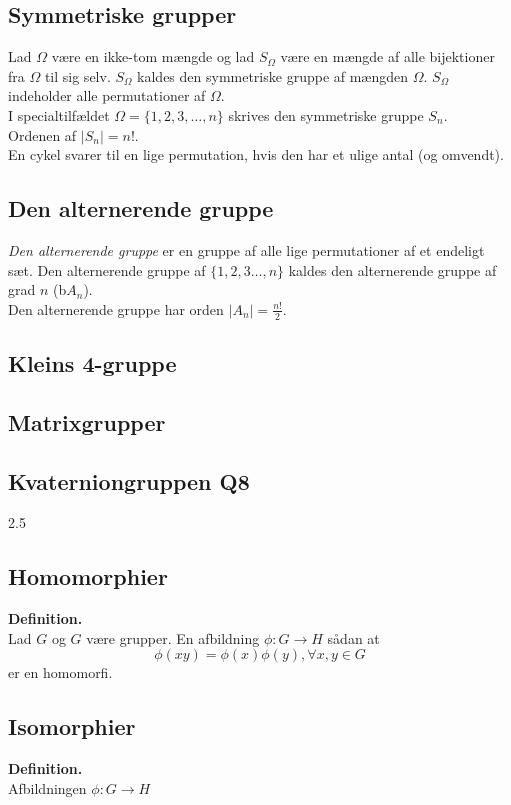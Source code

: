 \documentclass[11pt]{article}
\begin{document}
\subsection*{Symmetriske grupper}
Lad $\Omega$ være en ikke-tom mængde og lad $S_{\Omega}$ være en mængde af alle bijektioner fra $\Omega$ til sig selv. $S_{\Omega}$ kaldes den symmetriske gruppe af mængden $\Omega$. $S_{\Omega}$ indeholder alle permutationer af $\Omega$.\\
I specialtilfældet $\Omega = \{ 1,2,3, \hdots, n \}$ skrives den symmetriske gruppe $S_n$.\\
Ordenen af $|S_n| = n!$.\\
En cykel svarer til en lige permutation, hvis den har et ulige antal (og omvendt).
\subsection*{Den alternerende gruppe}
\textit{Den alternerende gruppe} er en gruppe af alle lige permutationer af et endeligt sæt. Den alternerende gruppe af $\{ 1,2,3 \hdots, n \}$ kaldes den alternerende gruppe af grad $n$ (b$A_n$).\\
Den alternerende gruppe har orden $|A_n| = \frac{n!}{2}$.
\subsection*{Kleins 4-gruppe}
\subsection*{Matrixgrupper}
\subsection*{Kvaterniongruppen Q8}
2.5
\subsection*{Homomorphier}
\textbf{Definition.}\\
Lad $G$ og $G$ være grupper. En afbildning $\phi : G \to H$ sådan at
$$\phi(xy) = \phi(x) \phi(y), \forall{x,y} \in G$$
er en homomorfi.

\subsection*{Isomorphier}
\textbf{Definition.}\\
Afbildningen $\phi : G \to H$
\end{document}

